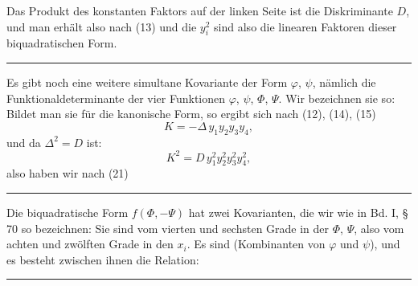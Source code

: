 
Das Produkt des konstanten Faktors auf der linken Seite ist die
Diskriminante $D$, und man erhält also nach (13)
und die $y_i^2$ sind also die linearen Faktoren dieser biquadratischen
Form.

\begin{center}
\rule{2cm}{0.4pt}
\end{center}

Es gibt noch eine weitere simultane Kovariante der Form $\varphi$,
$\psi$, nämlich die  Funktionaldeterminante der vier
Funktionen $\varphi$, $\psi$, $\Phi$, $\Psi$. Wir bezeichnen sie so:
Bildet man sie für die kanonische Form, so ergibt sich nach (12),
(14), (15)
\[
K = -\Delta\,y_1y_2y_3y_4,
\]
und da $\Delta^2 = D$ ist:
\[
K^2 = D\,y_1^2y_2^2y_3^2y_4^2,
\]
also haben wir nach (21)

\begin{center}
\rule{2cm}{0.4pt}
\end{center}

Die biquadratische Form $f(\Phi, -\Psi)$ hat zwei Kovarianten, die
wir wie in Bd. I, §\,70 so bezeichnen:
Sie sind vom vierten und sechsten Grade in der $\Phi$, $\Psi$, also
vom achten und zwölften Grade in den $x_i$. Es sind  (Kombinanten von $\varphi$ und $\psi$), und es besteht
zwischen ihnen die Relation:

\begin{center}
\rule{2cm}{0.4pt}
\end{center}
